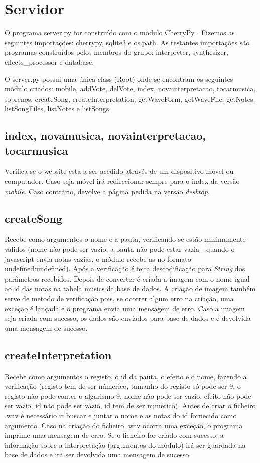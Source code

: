 \chapter{Servidor}
\label{chap.servidor}

O programa server.py for construído  com o módulo CherryPy \cite{cherry}. Fizemos as seguintes importações: cherrypy, sqlite3 e os.path. As restantes importações são programas construídos pelos membros do grupo: interpreter, synthesizer, effects\_processor e database.

O server.py possui uma única class (Root) onde se encontram os seguintes módulo criados: mobile, addVote, delVote, index, novainterpretacao, tocarmusica, sobrenos, createSong, createInterpretation, getWaveForm, getWaveFile, getNotes, listSongFiles, listNotes e listSongs.

\section{index, novamusica, novainterpretacao, tocarmusica}
Verifica se o website esta a ser acedido através de um dispositivo móvel ou computador. Caso seja móvel irá redirecionar sempre para o index da versão \emph{mobile}. Caso contrário, devolve a página pedida na versão \emph{desktop}.

\section{createSong}
Recebe como argumentos o nome e a pauta, verificando se estão minimamente válidos (nome não pode ser vazio, a pauta não pode estar vazia - quando o javascript envia notas vazias, o módulo recebe-as no formato undefined:undefined). Após a verificação é feita descodificação para \emph{String} dos parâmetros recebidos. Depois de converter é criada a imagem com o nome igual ao id das notas na tabela musics da base de dados. A criação de imagem também serve de metodo de verificação pois, se ocorrer algum erro na criação, uma exceção é lançada e o programa envia uma mensagem de erro. Caso a imagem seja criada com sucesso, os dados são enviados para base de dados e é devolvida uma mensagem de sucesso.

\section{createInterpretation}
Recebe como argumentos o registo, o id da pauta, o efeito e o nome, fazendo a verificação (registo tem de ser númerico, tamanho do registo só pode ser 9, o registo não pode conter o algarismo 9, nome não pode ser vazio, efeito não pode ser vazio, id não pode ser vazio, id tem de ser numérico). Antes de criar o ficheiro .wav é necessário ir buscar e juntar o nome e as notas do id fornecido como argumento. Caso na criação do ficheiro .wav ocorra uma exceção, o programa imprime uma mensagem de erro. Se o ficheiro for criado com sucesso, a informação sobre a interpretação (argumentos do módulo) irá ser guardada na base de dados e irá ser devolvida uma mensagem de sucesso.

